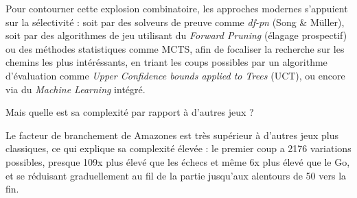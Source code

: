 \documentclass[12pt,a4paper,titlepage,oneside]{article}
\begin{document}
        Pour contourner cette explosion combinatoire, les approches modernes s'appuient sur la sélectivité : soit par des solveurs de preuve comme \textit{df-pn} (Song \& Müller), soit par des algorithmes de jeu utilisant du \textit{Forward Pruning} (élagage prospectif) ou des méthodes statistiques comme MCTS, afin de focaliser la recherche sur les chemins les plus intéréssants, en triant les coups possibles par un algorithme d'évaluation comme \textit{Upper Confidence bounds applied to Trees} (UCT), ou encore via du \textit{Machine Learning} intégré.
        
        Mais quelle est sa complexité par rapport à d'autres jeux ?
        

\begin{table}[h!]
    \centering
\renewcommand{\arraystretch}{1.5}
\caption{Comparaison des complexités \cite{complexities} \cite{gocomplexity}}
\end{table}
\renewcommand{\arraystretch}{1}
\medskip
        Le facteur de branchement de Amazones est très supérieur à d'autres jeux plus classiques, ce qui explique sa complexité élevée : le premier coup a 2176 variations possibles, presque 109x plus élevé que les échecs et même 6x plus élevé que le Go, et se réduisant graduellement au fil de la partie jusqu'aux alentours de 50 vers la fin.
        
\end{document}
